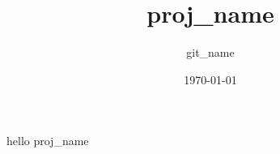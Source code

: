 \documentclass[12pt]{article}
\author{{{git_name}}}
\date{\today}
\title{{{proj_name}}}
\begin{document}
\maketitle

hello {{proj_name}}
\end{document}
